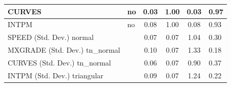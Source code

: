 \begin{table}
\begin{center}
\begin{tabular}{|l|l|c|c|c|l|}
			\hline
			CURVES & no & 0.03 & 1.00 & 0.03 & 0.97 \\
			\hline
			INTPM & no & 0.08 & 1.00 & 0.08 & 0.93 \\
			\hline
			SPEED (Std. Dev.) normal &  & 0.07 & 0.07 & 1.04 & 0.30 \\
			\hline
			MXGRADE (Std. Dev.) tn_normal &  & 0.10 & 0.07 & 1.33 & 0.18 \\
			\hline
			CURVES (Std. Dev.) tn_normal &  & 0.06 & 0.07 & 0.90 & 0.37 \\
			\hline
			INTPM (Std. Dev.) triangular &  & 0.09 & 0.07 & 1.24 & 0.22 \\
			\hline
		\end{tabular}
	\end{center}
\end{table}